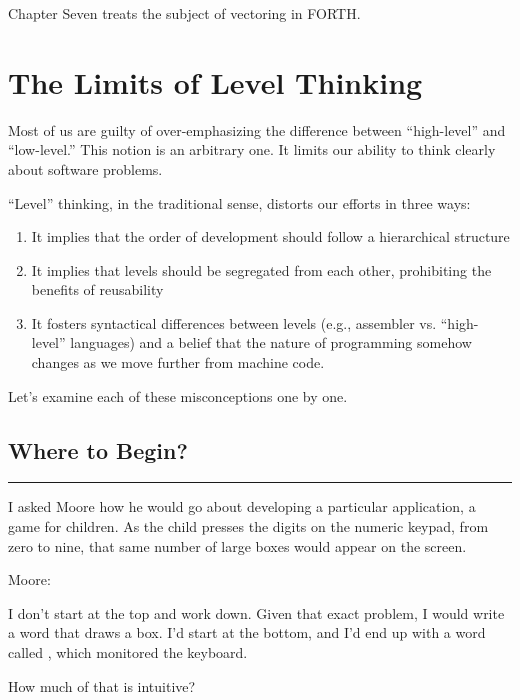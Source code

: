 Chapter Seven treats the subject of vectoring in FORTH.

\section{The Limits of Level Thinking}

Most of us are guilty of over-emphasizing the difference between
``high-level'' and ``low-level.'' This notion is an arbitrary one. It
limits our ability to think clearly about software problems.

``Level'' thinking, in the traditional sense, distorts our efforts in
three ways:

\begin{enumerate}
	\item It implies that the order of development should follow a hierarchical structure

	\item It implies that levels should be segregated from each other, prohibiting the
benefits of reusability

	\item It fosters syntactical differences between levels (e.g., assembler vs. ``high-level''
languages) and a belief that the nature of programming somehow
changes as we move further from machine code.
\end{enumerate}

Let's examine each of these misconceptions one by one.

\subsection{Where to Begin?}

\hrule height 1pt\vspace{2ex}

I asked Moore how he would go about developing a particular
application, a game for children. As the child presses the digits on
the numeric keypad, from zero to nine, that same number of large boxes
would appear on the screen.

	Moore:

\begin{tfquot}
	I don't start at the top and work down. Given that exact problem, I would
	write a word that draws a box. I'd start at the bottom, and I'd end up with a
	word called , which monitored the keyboard.
\end{tfquot}


\noindent How much of that is intuitive?

